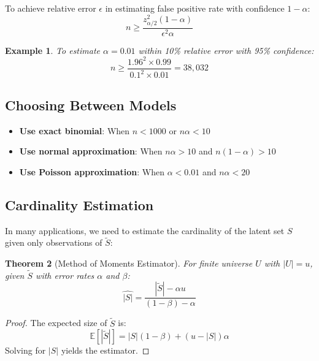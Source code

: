 \documentclass[11pt,final,hidelinks]{article}
\newtheorem{theorem}{Theorem}[section]
\newtheorem{example}[theorem]{Example}
\newcommand{\obs}[1]{\widetilde{#1}}  %
\newcommand{\Expect}[1]{\mathbb{E}\left[#1\right]}
\newcommand{\fprate}{\alpha}
\newcommand{\fnrate}{\beta}
\begin{document}
To achieve relative error $\epsilon$ in estimating false positive rate with confidence $1-\alpha$:
\begin{equation}
n \geq \frac{z_{\alpha/2}^2(1-\fprate)}{\epsilon^2 \fprate}
\end{equation}

\begin{example}
To estimate $\fprate = 0.01$ within 10\% relative error with 95\% confidence:
\begin{equation}
n \geq \frac{1.96^2 \times 0.99}{0.1^2 \times 0.01} = 38,032
\end{equation}
\end{example}

\subsection{Choosing Between Models}

\begin{itemize}
    \item \textbf{Use exact binomial}: When $n < 1000$ or $n\fprate < 10$
    \item \textbf{Use normal approximation}: When $n\fprate > 10$ and $n(1-\fprate) > 10$
    \item \textbf{Use Poisson approximation}: When $\fprate < 0.01$ and $n\fprate < 20$
\end{itemize}

\subsection{Cardinality Estimation}

In many applications, we need to estimate the cardinality of the latent set $S$ given only observations of $\obs{S}$:

\begin{theorem}[Method of Moments Estimator]
For finite universe $U$ with $|U| = u$, given $\obs{S}$ with error rates $\fprate$ and $\fnrate$:
\begin{equation}
\hat{|S|} = \frac{|\obs{S}| - \fprate u}{(1-\fnrate) - \fprate}
\end{equation}
\end{theorem}

\begin{proof}
The expected size of $\obs{S}$ is:
\begin{equation}
\Expect{|\obs{S}|} = |S|(1-\fnrate) + (u-|S|)\fprate
\end{equation}
Solving for $|S|$ yields the estimator.
\end{proof}
\end{document}
